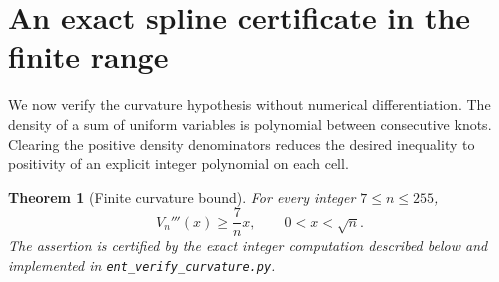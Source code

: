 \documentclass[11pt,a4paper]{article}
\newtheorem{theorem}{Theorem}[section]
\theoremstyle{remark}\newtheorem{remark}[theorem]{Remark}
\begin{document}
\section{An exact spline certificate in the finite range}\label{sec:finite-certificate}
We now verify the curvature hypothesis without numerical differentiation.
The density of a sum of uniform variables is polynomial between consecutive
knots. Clearing the positive density denominators reduces the desired
inequality to positivity of an explicit integer polynomial on each cell.

\begin{theorem}[Finite curvature bound]\label{thm:finite-curvature}
For every integer $7\le n\le255$,
\[
 V_n'''(x)\ge\frac7n x,\qquad 0<x<\sqrt n.
\]
The assertion is certified by the exact integer computation described
below and implemented in \texttt{ent\_verify\_curvature.py}.
\end{theorem}
\end{document}
